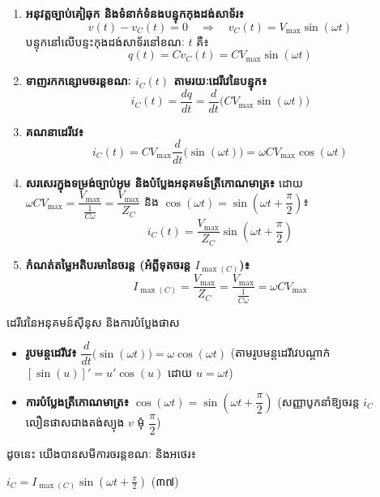 \begin{enumerate}[leftmargin=2em, itemsep=4pt]
	\item \textbf{អនុវត្តច្បាប់គៀឆុក និងទំនាក់ទំនងបន្ទុកកុងដង់សាទ័រ៖}
	\[ v(t) - v_C(t) = 0 \quad \Longrightarrow \quad v_C(t) = V_{\max}\sin(\omega t) \]
	បន្ទុកនៅលើបន្ទះកុងដង់សាទ័រនៅខណៈ $t$ គឺ៖
	\[ q(t) = C v_C(t) = C V_{\max}\sin(\omega t) \]

	\item \textbf{ទាញរកកន្សោមចរន្តខណៈ $i_C(t)$ តាមរយៈដេរីវេនៃបន្ទុក៖}
	\[ i_C(t) = \dfrac{dq}{dt} = \dfrac{d}{dt}\Big(C V_{\max}\sin(\omega t)\Big) \]

	\item \textbf{គណនាដេរីវេ៖}
	\[ i_C(t) = C V_{\max}\dfrac{d}{dt}\big(\sin(\omega t)\big) = \omega C V_{\max}\cos(\omega t) \]

	\item \textbf{សរសេរក្នុងទម្រង់ច្បាប់អូម និងបំប្លែងអនុគមន៍ត្រីកោណមាត្រ៖}
	ដោយ $\omega C V_{\max} = \dfrac{V_{\max}}{\frac{1}{C\omega}} = \dfrac{V_{\max}}{Z_C}$ \quad និង \quad $\cos(\omega t) = \sin\left(\omega t + \dfrac{\pi}{2}\right)$៖
	\[ i_C(t) = \dfrac{V_{\max}}{Z_C}\sin\left(\omega t + \dfrac{\pi}{2}\right) \]

	\item \textbf{កំណត់តម្លៃអតិបរមានៃចរន្ត (អំព្លីទុតចរន្ត $I_{\max(C)}$)៖}
	\[ I_{\max(C)} = \dfrac{V_{\max}}{Z_C} = \dfrac{V_{\max}}{\frac{1}{C\omega}} = \omega C V_{\max} \]
\end{enumerate}

\begin{mathbox}{ដេរីវេនៃអនុគមន៍ស៊ីនុស និងការបំប្លែងផាស}
	\begin{itemize}[itemsep=2pt, topsep=1pt, parsep=0pt, leftmargin=1.4em]
		\item \textbf{រូបមន្តដេរីវេ៖} $\dfrac{d}{dt}\big(\sin(\omega t)\big) = \omega\cos(\omega t)$ \quad (តាមរូបមន្តដេរីវេបណ្តាក់ $[\sin(u)]' = u'\cos(u)$ ដោយ $u = \omega t$)
		\item \textbf{ការបំប្លែងត្រីកោណមាត្រ៖} $\cos(\omega t) = \sin\left(\omega t + \dfrac{\pi}{2}\right)$ \quad (សញ្ញាបូកនាំឱ្យចរន្ត $i_C$ លឿនផាសជាងតង់ស្យុង $v$ មុំ $\dfrac{\pi}{2}$)
	\end{itemize}
\end{mathbox}

\vspace{0.2em}
\noindent
ដូចនេះ យើងបានសមីការចរន្តខណៈ និងអថេរ៖
\begin{center}
	$\boxed{i_C = I_{\max(C)}\sin\left(\omega t + \frac{\pi}{2}\right)}$ \quad (៣៧)
\end{center}


